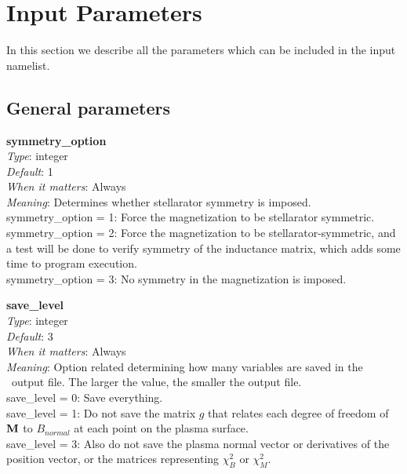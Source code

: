 \chapter{Input Parameters}
\label{ch:input}

\newcommand{\param}[5]{{\setlength{\parindent}{0cm} {\ttfamily \bfseries \hypertarget{#1}{#1}}\\{\it Type}: #2\\{\it Default}: #3\\{\it When it matters}: #4\\{\it Meaning}: #5}}
\newcommand{\myhrule}{{\setlength{\parindent}{0cm} \hrulefill }}

\newcommand{\true}{{\ttfamily .true.}}
\newcommand{\false}{{\ttfamily .false.}}

In this section we describe all the parameters which can be included in the input namelist. 

\section{General parameters}

\param{symmetry\_option}
{integer}
{1}
{Always}
{Determines whether stellarator symmetry is imposed.\\

{\ttfamily symmetry\_option} = 1: Force the magnetization to be stellarator symmetric.\\

{\ttfamily symmetry\_option} = 2: Force the magnetization to be stellarator-symmetric, and a test will be done to verify symmetry of the inductance matrix, which adds some time to program execution.\\

{\ttfamily symmetry\_option} = 3: No symmetry in the magnetization is imposed.
}

\myhrule

\param{save\_level}
{integer}
{3}
{Always}
{Option related determining how many variables are saved in the \netCDF~output file.  The larger the value, the smaller the output file.\\

{\ttfamily save\_level} = 0: Save everything.\\

{\ttfamily save\_level} = 1: Do not save the matrix $g$ that relates each degree of freedom of ${\mathbf M}$ to $B_{normal}$ at each point on the plasma surface.\\

{\ttfamily save\_level} = 3: Also do not save the plasma normal vector or derivatives of the position vector, or the matrices representing $\chi_B^2$ or $\chi_M^2$.
}

